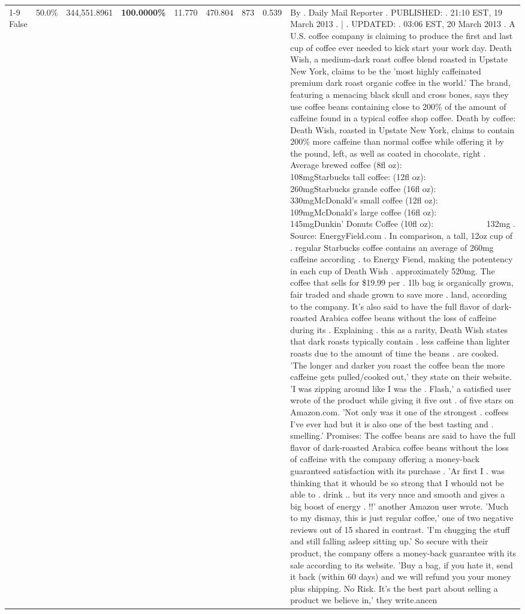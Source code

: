 \begin{table}[H]
{\begin{tabular}{lllrlllll}
\cline{1-9}
False & 50.0\% & 344,551.8961 & \bfseries \color{red} 100.0000\% & 11.770 & 470.804 & 873 & 0.539 & By . Daily Mail Reporter . PUBLISHED: . 21:10 EST, 19 March 2013 . | . UPDATED: . 03:06 EST, 20 March 2013 . A U.S. coffee company is claiming to produce the first and last cup of coffee ever needed to kick start your work day. Death Wish, a medium-dark roast coffee blend roasted in Upstate New York, claims to be the 'most highly caffeinated premium dark roast organic coffee in the world.' The brand, featuring a menacing black skull and cross bones, says they use coffee beans containing close to 200\% of the amount of caffeine found in a typical coffee shop coffee. Death by coffee: Death Wish, roasted in Upstate New York, claims to contain 200\% more caffeine than normal coffee while offering it by the pound, left, as well as coated in chocolate, right . Average brewed coffee (8fl oz):              108mgStarbucks tall coffee: (12fl oz):                260mgStarbucks grande coffee (16fl oz):         330mgMcDonald's small coffee (12fl oz):           109mgMcDonald's large coffee (16fl oz):           145mgDunkin' Donuts Coffee (10fl oz):             132mg . Source: EnergyField.com . In comparison, a tall, 12oz cup of . regular Starbucks coffee contains an average of 260mg caffeine according . to Energy Fiend, making the potentency in each cup of Death Wish . approximately 520mg. The coffee that sells for \$19.99 per . 1lb bag is organically grown, fair traded and shade grown to save more . land, according to the company. It's also said to have the full flavor of dark-roasted Arabica coffee beans without the loss of caffeine during its . Explaining . this as a rarity, Death Wish states that dark roasts typically contain . less caffeine than lighter roasts due to the amount of time the beans . are cooked. 'The longer and darker you roast the coffee bean the more caffeine gets pulled/cooked out,' they state on their website. 'I was zipping around like I was the . Flash,' a satisfied user wrote of the product while giving it five out . of five stars on Amazon.com. 'Not only was it one of the strongest . coffees I've ever had but it is also one of the best tasting and . smelling.’ Promises: The coffee beans are said to have the full flavor of dark-roasted Arabica coffee beans without the loss of caffeine with the company offering a money-back guaranteed satisfaction with its purchase . 'Ar first I . was thinking that it whould be so strong that I whould not be able to . drink .. but its very nuce and smooth and gives a big boost of energy . !!' another Amazon user wrote. 'Much to my dismay, this is just regular coffee,' one of two negative reviews out of 15 shared in contrast. 'I'm chugging the stuff and still falling asleep sitting up.' So secure with their product, the company offers a money-back guarantee with its sale according to its website. 'Buy a bag, if you hate it, send it back (within 60 days) and we will refund you your money plus shipping. No Risk. It’s the best part about selling a product we believe in,' they write.ancen \\

\end{tabular}}
\end{table}
